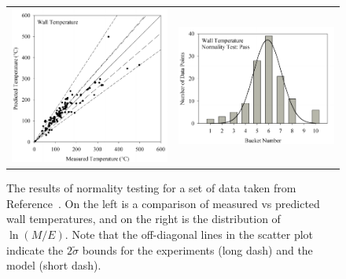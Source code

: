 \begin{figure}[ht!]
\begin{tabular}{ll}
\includegraphics[width=3.2in]{FIGURES/Wall_Temperature_Scatter} &
\includegraphics[width=3.2in]{FIGURES/Wall_Temperature_Normality}
\end{tabular}
\caption[Testing the normality of validation data.]{The results of normality testing for a set of data taken from Reference~\cite{NUREG_1824}. On the
left is a comparison of measured vs predicted wall temperatures, and on the right is the distribution of $\ln(M/E)$. Note that the off-diagonal lines in the scatter plot
indicate the $2 \widetilde{\sigma}$ bounds for the experiments (long dash) and the model (short dash).}
\label{Normality}
\end{figure}

